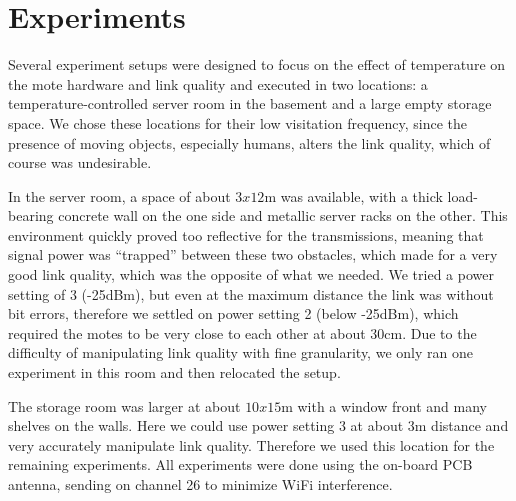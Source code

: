 \chapter{Experiments}

Several experiment setups were designed to focus on the effect of temperature on the mote hardware and link quality and executed in two locations: a temperature-controlled server room in the basement and a large empty storage space.
We chose these locations for their low visitation frequency, since the presence of moving objects, especially humans, alters the link quality, which of course was undesirable.

In the server room, a space of about $3x12$m was available, with a thick load-bearing concrete wall on the one side and metallic server racks on the other.
This environment quickly proved too reflective for the transmissions, meaning that signal power was ``trapped'' between these two obstacles, which made for a very good link quality, which was the opposite of what we needed.
We tried a power setting of 3 (-25dBm), but even at the maximum distance the link was without bit errors, therefore we settled on power setting 2 (below -25dBm), which required the motes to be very close to each other at about 30cm.
Due to the difficulty of manipulating link quality with fine granularity, we only ran one experiment in this room and then relocated the setup.

The storage room was larger at about $10x15$m with a window front and many shelves on the walls.
Here we could use power setting 3 at about 3m distance and very accurately manipulate link quality.
Therefore we used this location for the remaining experiments.
All experiments were done using the on-board PCB antenna, sending on channel 26 to minimize WiFi interference.







